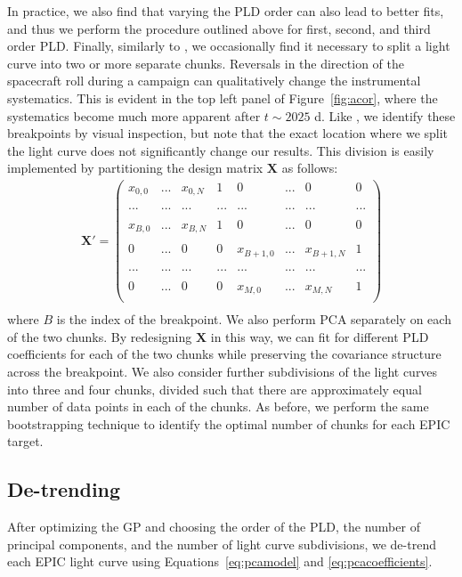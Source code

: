 \documentclass[]{emulateapj}
\begin{document}
In practice, we also find that varying the PLD order can also lead to better fits, and thus we perform the
procedure outlined above for first, second, and third order PLD. Finally, similarly to \cite{AIG16}, 
we occasionally find it necessary to split a light curve into two or more separate chunks. Reversals in
the direction of the spacecraft roll during a campaign can qualitatively change the instrumental
systematics. This is evident in the top left panel of Figure~\ref{fig:acor}, where the systematics
become much more apparent after $t \sim 2025$ d. Like \cite{AIG16}, we identify these breakpoints
by visual inspection, but note that the exact location where we split the light curve does not
significantly change our results. This division is easily implemented by partitioning the design
matrix $\mathbf{X}$ as follows:
\begin{align}
\label{eq:designmatrixsplit}
\mathbf{X'} =  
\begin{pmatrix}
x_{0,0} & ... & x_{0,N} & 1 & 0 & ... & 0 & 0\\
\\
... & ... & ... & ... & ... & ... & ... & ...\\
\\
x_{B,0} & ... & x_{B,N} & 1 & 0 & ... & 0 & 0\\
\\
0 & ... & 0 & 0 & x_{B+1,0} & ... & x_{B+1,N} & 1\\
\\
... & ... & ... & ... & ... & ... & ... & ...\\
\\
0 & ... & 0 & 0 & x_{M,0} & ... & x_{M,N} & 1\\
\end{pmatrix}\nonumber\\
\end{align}
where $B$ is the index of the breakpoint. We also perform PCA separately on each of the 
two chunks. By redesigning $\mathbf{X}$ in this way, we can fit for different PLD 
coefficients for each of the two chunks while preserving the covariance structure 
across the breakpoint. We also consider further subdivisions of the light curves into
three and four chunks, divided such that there are approximately equal number of 
data points in each of the chunks. As before, we perform the same bootstrapping technique
to identify the optimal number of chunks for each EPIC target.

\subsection{De-trending}
After optimizing the GP and choosing the order of the PLD, the number of principal components, and the 
number of light curve subdivisions, we de-trend each EPIC light curve using
Equations~\ref{eq:pcamodel} and \ref{eq:pcacoefficients}.
\end{document}
